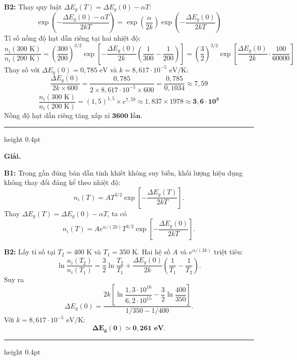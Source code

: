 \documentclass[11pt,a4paper]{article}
\renewcommand{\boldsymbol}[1]{\symbf{#1}}
\let\DeBaiOriginal\DeBai
\renewcommand{\DeBai}[1]{\par\Needspace{5\baselineskip}\DeBaiOriginal{#1}}
\newcommand{\PhanCachBai}{%
  \par\Needspace{7\baselineskip}%
  \addvspace{6pt}%
  {\color{black!40}\hrule height 0.4pt}%
  \nobreak\vspace{7pt}\nobreak
}
\begin{document}
\textbf{B2:} Thay quy luật $\Delta E_g(T) = \Delta E_g(0) - \alpha T$:
\begin{equation*}
    \exp\left(-\frac{\Delta E_g(0) - \alpha T}{2kT}\right) = \exp\left(\frac{\alpha}{2k}\right) \exp\left(-\frac{\Delta E_g(0)}{2kT}\right)
\end{equation*}
Tỉ số nồng độ hạt dẫn riêng tại hai nhiệt độ:
\begin{equation*}
    \frac{n_i(300\text{ K})}{n_i(200\text{ K})} = \left(\frac{300}{200}\right)^{3/2} \exp\left[-\frac{\Delta E_g(0)}{2k}\left(\frac{1}{300} - \frac{1}{200}\right)\right] = \left(\frac{3}{2}\right)^{3/2} \exp\left[\frac{\Delta E_g(0)}{2k} \cdot \frac{100}{60000}\right]
\end{equation*}
Thay số với $\Delta E_g(0) = 0{,}785\text{ eV}$ và $k = 8{,}617 \cdot 10^{-5}\text{ eV/K}$:
\begin{equation*}
    \frac{\Delta E_g(0)}{2k \times 600} = \frac{0{,}785}{2 \times 8{,}617 \cdot 10^{-5} \times 600} = \frac{0{,}785}{0{,}1034} \approx 7{,}59
\end{equation*}
\begin{equation*}
    \frac{n_i(300\text{ K})}{n_i(200\text{ K})} = (1{,}5)^{1{,}5} \times e^{7{,}59} \approx 1{,}837 \times 1978 \approx \boldsymbol{3{,}6 \cdot 10^3}
\end{equation*}
Nồng độ hạt dẫn riêng tăng xấp xỉ $\boldsymbol{3600\text{ lần}}$.

\PhanCachBai


\textbf{Giải.}

\textbf{B1:} Trong gần đúng bán dẫn tinh khiết không suy biến, khối lượng hiệu dụng
không thay đổi đáng kể theo nhiệt độ:
\[
n_i(T)=A T^{3/2}\exp\left[-\frac{\Delta E_g(T)}{2kT}\right].
\]
Thay $\Delta E_g(T)=\Delta E_g(0)-\alpha T$, ta có
\[
n_i(T)=A e^{\alpha/(2k)}T^{3/2}
\exp\left[-\frac{\Delta E_g(0)}{2kT}\right].
\]

\textbf{B2:} Lấy tỉ số tại $T_2=400\text{ K}$ và $T_1=350\text{ K}$.
Hai hệ số $A$ và $e^{\alpha/(2k)}$ triệt tiêu:
\[
\ln\frac{n_i(T_2)}{n_i(T_1)}
=\frac32\ln\frac{T_2}{T_1}
+\frac{\Delta E_g(0)}{2k}\left(\frac1{T_1}-\frac1{T_2}\right).
\]
Suy ra
\[
\Delta E_g(0)=
\frac{2k\left[\ln\dfrac{1{,}3\cdot10^{16}}{6{,}2\cdot10^{15}}
-\dfrac32\ln\dfrac{400}{350}\right]}{1/350-1/400}.
\]
Với $k=8{,}617\cdot10^{-5}\text{ eV/K}$:
\[
\boldsymbol{\Delta E_g(0)\simeq0{,}261\text{ eV}}.
\]

\PhanCachBai
\end{document}
